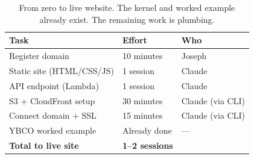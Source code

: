 \documentclass[11pt,letterpaper]{article}
\begin{document}
\begin{table}[h]
\centering
\begin{tabular}{@{}lll@{}}
\toprule
\textbf{Task} & \textbf{Effort} & \textbf{Who} \\
\midrule
Register domain & 10 minutes & Joseph \\
Static site (HTML/CSS/JS) & 1 session & Claude \\
API endpoint (Lambda) & 1 session & Claude \\
S3 + CloudFront setup & 30 minutes & Claude (via CLI) \\
Connect domain + SSL & 15 minutes & Claude (via CLI) \\
YBCO worked example & Already done & --- \\
\midrule
\textbf{Total to live site} & \textbf{1--2 sessions} & \\
\bottomrule
\end{tabular}
\caption{From zero to live website. The kernel and worked example
already exist. The remaining work is plumbing.}
\end{table}
\end{document}
